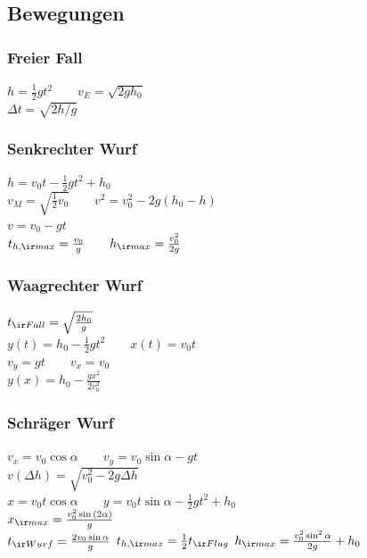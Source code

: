 \begin{sectionbox}
    \subsection{Bewegungen}

    \subsubsection{Freier Fall}
    $h=\frac{1}{2}gt^2 \qquad v_E=\sqrt{2gh_0}$\\
    $\Delta t = \sqrt{2h/g}$

    \subsubsection{Senkrechter Wurf}
    $h=v_0t-\frac{1}{2}gt^2+h_0$\\
    $v_M=\sqrt{\frac{1}{2}v_0} \qquad v^2 = v_0^2-2g(h_0-h)$\\
    $v=v_0-g  t$\\
    $t_{h,\ir max}=\frac{v_0}{g} \qquad h_{\ir max}=\frac{v_0^2}{2g}$

    \subsubsection{Waagrechter Wurf}
    $t_{\ir Fall}=\sqrt{\frac{2h_0}{g}}$ \\
    $y(t)=h_0-\frac{1}{2}gt^2 \qquad x(t)=v_0  t$\\
    $v_y=gt \qquad v_x = v_0$\\
    $y(x)=h_0-\frac{g  x^2}{2v_0^2}$

    \subsubsection{Schräger Wurf}
    $v_x=v_0\cos \alpha \qquad v_y=v_0\sin \alpha -gt$\\
    $v(\Delta h)=\sqrt{v_0^2-2g\Delta h}$\\
    $x=v_0t\cos \alpha \qquad y=v_0t \sin \alpha - \frac{1}{2} gt^2 +h_0$\\
    $x_{\ir max}=\frac{v_0^2 \sin{(2\alpha)}}{g}$\\
    $t_{\ir Wurf}=\frac{2v_0\sin \alpha}{g}$ \quad
    $t_{h,\ir max}=\frac{1}{2}t_{\ir Flug}$ \quad
    $h_{\ir max}=\frac{v_0^2 \sin^2 \alpha}{2g}+h_0$ \\



\end{sectionbox}
